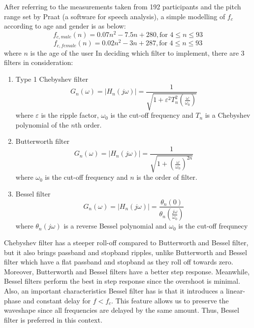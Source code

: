 After referring to the measurements taken from 192 participants and the pitch range
set by Praat (a software for speech analysis), a simple modelling of $f_c$ according to age and gender
is as below:
\[f_{c,male}(n) = 0.07n^2 - 7.5n + 280, \text{for } 4 \leq n\leq 93 \label{male} \] 
\[f_{c,female}(n) = 0.02n^2 - 3n + 287, \text{for } 4 \leq n \leq 93 \label{female} \] 
where $n$ is the age of the user
In deciding which filter to implement, there are 3 filters in consideration:
\begin{enumerate}[label=(\alph*)]
	\item Type 1 Chebyshev filter
	\[G_{n}(\omega) = |H_{n}(j\omega)| = {\frac{1}{\sqrt{1+\varepsilon^{2} T_{n}^{2}(\frac{\omega}{\omega_{0}})}}}\]
	where $\varepsilon$  is the ripple factor, $\omega _{0}$ is the cut-off frequency
	and $T_{n}$ is a Chebyshev polynomial of the $n$th order.
	\item Butterworth filter
	\[G_{n}(\omega) = |H_{n}(j\omega)| = {\frac{1}{\sqrt{1+(\frac{\omega}{\omega_{0}})^{2n}}}}\]
	where $\omega _{0}$ is the cut-off frequency and $n$ is the order of filter.
	\item Bessel filter
	\[G_{n}(\omega) = |H_{n}(j\omega)| ={\frac {\theta _{n}(0)}{\theta _{n}(\frac{j\omega}{\omega _{0}})}}\]
	where $\theta _{n}(j\omega)$ is a reverse Bessel polynomial and $\omega _{0}$ is the cut-off frequnecy
\end{enumerate}

Chebyshev filter has a steeper roll-off compared to Butterworth and Bessel filter, but it also brings passband and stopband ripples, 
unlike Butterworth and Bessel filter which have a flat passband and stopband as they roll off towards zero. Moreover, Butterworth 
and Bessel filters have a better step response. Meanwhile, Bessel filters perform the best in step response since the overshoot is
minimal. Also, an important characteristics Bessel filter has is that it introduces a linear-phase and constant delay for $f<f_c$. This
feature allows us to preserve the waveshape since all frequencies are delayed by the same amount.
Thus, Bessel filter is preferred in this context.

